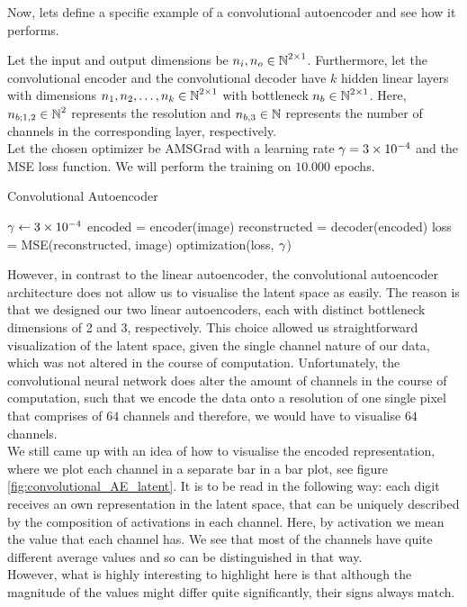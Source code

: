 Now, lets define a specific example of a convolutional autoencoder and see how it performs.

\begin{algorithm}
Let the input and output dimensions be $n_i, n_o \in \operatorname{\mathbb{N}}^{2\times 1}$. Furthermore, let the convolutional encoder and the convolutional decoder have $k$ hidden linear layers with dimensions $n_1, n_2,\ldots, n_k\in \operatorname{\mathbb{N}}^{2\times 1}$ with bottleneck $n_b\in\operatorname{\mathbb{N}}^{2\times 1}$. Here, $n_{b;1,2}\in\operatorname{\mathbb{N}}^{2}$ represents the resolution and $n_{b,3}\in\operatorname{\mathbb{N}}$ represents the number of channels in the corresponding layer, respectively.\\
Let the chosen optimizer be AMSGrad with a learning rate $\operatorname{\gamma}=\num{3e-4}$ and the MSE loss function. We will perform the training on $10.000$ epochs.
\caption{Convolutional Autoencoder}\label{alg:convolutional_AE}
\begin{algorithmic}[1]
\Require $\operatorname{\gamma} \gets \num{3e-4}$
	    \State encoded = encoder(image) 
		\State reconstructed = decoder(encoded) 
    	\State loss = MSE(reconstructed, image) 
	    \State optimization(loss, $\operatorname{\gamma}$) 
    \EndFor
\EndFor
\end{algorithmic}
\end{algorithm}

However, in contrast to the linear autoencoder, the convolutional autoencoder architecture does not allow us to visualise the latent space as easily. The reason is that we designed our two linear autoencoders, each with distinct bottleneck dimensions of 2 and 3, respectively. This choice allowed us straightforward visualization of the latent space, given the single channel nature of our data, which was not altered in the course of computation. Unfortunately, the convolutional neural network does alter the amount of channels in the course of computation, such that we encode the data onto a resolution of one single pixel that comprises of $64$ channels and therefore, we would have to visualise $64$ channels.\\
We still came up with an idea of how to visualise the encoded representation, where we plot each channel in a separate bar in a bar plot, see figure \ref{fig:convolutional_AE_latent}. It is to be read in the following way: each digit receives an own representation in the latent space, that can be uniquely described by the composition of activations in each channel. Here, by activation we mean the value that each channel has. We see that most of the channels have quite different average values and so can be distinguished in that way.\\
However, what is highly interesting to highlight here is that although the magnitude of the values might differ quite significantly, their signs always match.



